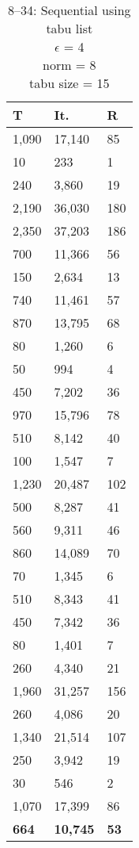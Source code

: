 \begin{table}
\begin{minipage}[t]{0.47\textwidth}
\begin{tabular}{R{1cm}|R{1.3cm}|R{0.7cm}}
\hline
T & It. & R\\
,090 & 17,140 & 85\\
10 & 233 & 1\\
240 & 3,860 & 19\\
2,190 & 36,030 & 180\\
2,350 & 37,203 & 186\\
700 & 11,366 & 56\\
150 & 2,634 & 13\\
740 & 11,461 & 57\\
870 & 13,795 & 68\\
80 & 1,260 & 6\\
50 & 994 & 4\\
450 & 7,202 & 36\\
970 & 15,796 & 78\\
510 & 8,142 & 40\\
100 & 1,547 & 7\\
1,230 & 20,487 & 102\\
500 & 8,287 & 41\\
560 & 9,311 & 46\\
860 & 14,089 & 70\\
70 & 1,345 & 6\\
510 & 8,343 & 41\\
450 & 7,342 & 36\\
80 & 1,401 & 7\\
260 & 4,340 & 21\\
1,960 & 31,257 & 156\\
260 & 4,086 & 20\\
1,340 & 21,514 & 107\\
250 & 3,942 & 19\\
30 & 546 & 2\\
1,070 & 17,399 & 86\\
\hline
\textbf{664} & \textbf{10,745} & \textbf{53}\\
\hline
\end{tabular}
\caption{\gr{} 8--34: Sequential using tabu list\\ $\epsilon$ = 4\\norm = 8\\tabu size = 15}\label{subtab:gr_seq_tabu}
\end{minipage}
\end{table}

